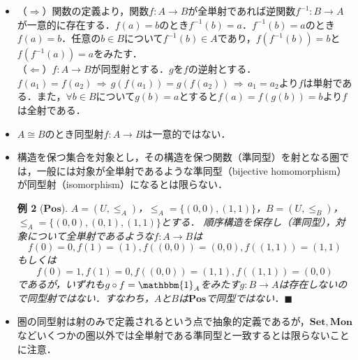 \documentclass[dvipdfmx,a4j,10pt]{jsarticle}
\makeatletter
\theoremstyle{mystyle1}
\theoremstyle{mystyle2}
\newtheorem{example}{例}
\theoremstyle{mystyle3}
\renewenvironment{proof}[1][\proofname]{\par
  \pushQED{\qed}%
  \normalfont
  \topsep6\p@\@plus6\p@ \trivlist
  \item[\hskip\labelsep{\bfseries\sffamily #1}]\ignorespaces
}{%
  \popQED\endtrivlist\@endpefalse
}
\renewcommand\proofname{証明}
\makeatother
\begin{document}
\begin{itemize}
          \begin{example}[\textbf{Set}]
              $\mathbf{Set}$の同型射は全単射と一致する．
          \end{example}
          \begin{proof}
              （$\Rightarrow$）関数の定義より，関数$f:A\to B$が全単射であれば逆関数$f^{-1}:B\to A$が一意的に存在する．$f(a)=b$のとき$f^{-1}(b)=a$．$f^{-1}(b)=a$のとき$f(a)=b$．任意の$b\in B$について$f^{-1}(b)\in A$であり，$f(f^{-1}(b))=b$と$f(f^{-1}(a))=a$をみたす．\\
              （$\Leftarrow$）$f:A\to B$が同型射とする．$g$を$f$の逆射とする．$f(a_1)=f(a_2)\,\Rightarrow\, g(f(a_1))=g(f(a_2))\,\Rightarrow\, a_1=a_2$より$f$は単射である．また，$\forall b\in B$について$g(b)=a$とすると$f(a)=f(g(b))=b$より$f$は全射である．
          \end{proof}
    \item $A\cong B$のとき同型射$f:A\to B$は一意的ではない．
    \item 構造を保つ集合を対象とし，その構造を保つ関数（準同型）を射となる圏では，一般には対象が全単射であるような準同型（bijective homomorphism）が同型射（isomorphism）になるとは限らない．
          \begin{example}[$\mathbf{Pos}$]
              $A=(U,\leq_A)$，$\leq_A=\{(0,0),(1,1)\}$，$B=(U,\leq_B)$，$\leq_A=\{(0,0),(0,1),(1,1)\}$とする．
              順序構造を保存し（準同型），対象について全単射であるような$f:A\to B$は
              \[
                  f(0)=0,f(1)=(1),f((0,0))=(0,0),f((1,1))=(1,1)
              \]
              もしくは
              \[
                  f(0)=1,f(1)=0,f((0,0))=(1,1),f((1,1))=(0,0)
              \]
              であるが，いずれも$g\circ f=\mathbbm{1}_A$をみたす$g:B\to A$は存在しないので同型射ではない．すなわち，$A$と$B$は$\mathbf{Pos}$で同型ではない．$\blacksquare$
          \end{example}
    \item 圏の同型射は射のみで定義されるという点で抽象的定義であるが，$\mathbf{Set},\mathbf{Mon}$などいくつかの圏以外では全単射である準同型と一致するとは限らないことに注意．
\end{itemize}
\end{document}
